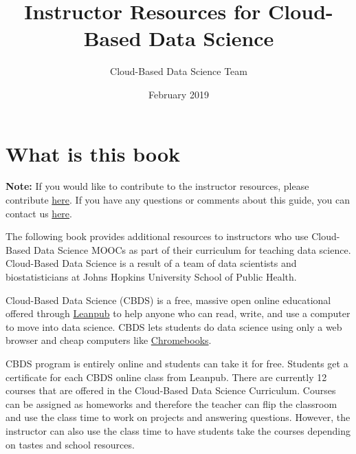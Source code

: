 \documentclass[]{book}
\title{Instructor Resources for Cloud-Based Data Science}
\author{Cloud-Based Data Science Team}
\date{February 2019}
\begin{document}
\maketitle

{
\setcounter{tocdepth}{1}
\tableofcontents
}
\hypertarget{what-is-this-book}{%
\chapter*{What is this book}\label{what-is-this-book}}

\textbf{Note:} If you would like to contribute to the instructor resources, please contribute \url{here}. If you have any questions or comments about this guide, you can contact us \href{https://www.clouddatascience.org/contact}{here}.

The following book provides additional resources to instructors who use Cloud-Based Data Science MOOCs as part of their curriculum for teaching data science. Cloud-Based Data Science is a result of a team of data scientists and biostatisticians at Johns Hopkins University School of Public Health.

Cloud-Based Data Science (CBDS) is a free, massive open online educational offered through \href{https://leanpub.com/universities/set/jhu/cloud-based-data-science}{Leanpub} to help anyone who can read, write, and use a computer to move into data science. CBDS lets students do data science using only a web browser and cheap computers like \href{https://www.google.com/chromebook}{Chromebooks}.

CBDS program is entirely online and students can take it for free. Students get a certificate for each CBDS online class from Leanpub. There are currently 12 courses that are offered in the Cloud-Based Data Science Curriculum. Courses can be assigned as homeworks and therefore the teacher can flip the classroom and use the class time to work on projects and answering questions. However, the instructor can also use the class time to have students take the courses depending on tastes and school resources.
\end{document}
